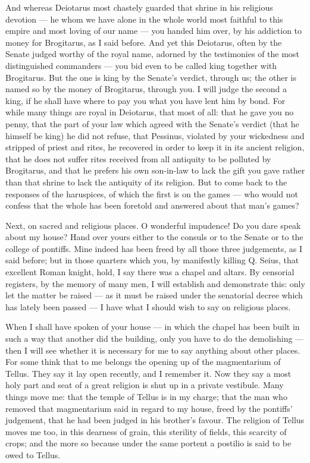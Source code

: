  And whereas Deiotarus most chastely guarded that shrine in his religious devotion --- he whom we have alone in the whole world most faithful to this empire and most loving of our name --- you handed him over, by his addiction to money for Brogitarus, as I said before. And yet this Deiotarus, often by the Senate judged worthy of the royal name, adorned by the testimonies of the most distinguished commanders --- you bid even to be called king together with Brogitarus. But the one is king by the Senate's verdict, through us; the other is named so by the money of Brogitarus, through you. I will judge the second a king, if he shall have where to pay you what you have lent him by bond. For while many things are royal in Deiotarus, that most of all: that he gave you no penny, that the part of your law which agreed with the Senate's verdict (that he himself be king) he did not refuse, that Pessinus, violated by your wickedness and stripped of priest and rites, he recovered in order to keep it in its ancient religion, that he does not suffer rites received from all antiquity to be polluted by Brogitarus, and that he prefers his own son-in-law to lack the gift you gave rather than that shrine to lack the antiquity of its religion. But to come back to the responses of the haruspices, of which the first is on the games --- who would not confess that the whole has been foretold and answered about that man's games?

 Next, on sacred and religious places. O wonderful impudence! Do you dare speak about my house? Hand over yours either to the consuls or to the Senate or to the college of pontiffs. Mine indeed has been freed by all those three judgements, as I said before; but in those quarters which you, by manifestly killing Q. Seius, that excellent Roman knight, hold, I say there was a chapel and altars. By censorial registers, by the memory of many men, I will establish and demonstrate this: only let the matter be raised --- as it must be raised under the senatorial decree which has lately been passed --- I have what I should wish to say on religious places.

 When I shall have spoken of your house --- in which the chapel has been built in such a way that another did the building, only you have to do the demolishing --- then I will see whether it is necessary for me to say anything about other places. For some think that to me belongs the opening up of the magmentarium of Tellus. They say it lay open recently, and I remember it. Now they say a most holy part and seat of a great religion is shut up in a private vestibule. Many things move me: that the temple of Tellus is in my charge; that the man who removed that magmentarium said in regard to my house, freed by the pontiffs' judgement, that he had been judged in his brother's favour. The religion of Tellus moves me too, in this dearness of grain, this sterility of fields, this scarcity of crops; and the more so because under the same portent a postilio is said to be owed to Tellus.

